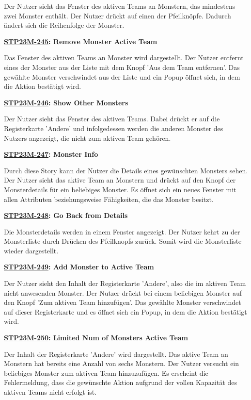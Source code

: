 Der Nutzer sieht das Fenster des aktiven Teams an Monstern, das mindestens zwei Monster enthält. Der Nutzer drückt auf einen der Pfeilknöpfe. Dadurch ändert sich die Reihenfolge der Monster. 

\textbf{\hyperlink{T245}{\hypertarget{S245}{STP23M-245}}: Remove Monster Active Team}

Das Fenster des aktiven Teams an Monster wird dargestellt. Der Nutzer entfernt eines der Monster aus der Liste mit dem Knopf 'Aus dem Team entfernen'. Das gewählte Monster verschwindet aus der Liste und ein Popup öffnet sich, in dem die Aktion bestätigt wird. 

\textbf{\hyperlink{T246}{\hypertarget{S246}{STP23M-246}}: Show Other Monsters}

Der Nutzer sieht das Fenster des aktiven Teams. Dabei drückt er auf die Registerkarte 'Andere' und infolgedessen werden die anderen Monster des Nutzers angezeigt, die nicht zum aktiven Team gehören.

\textbf{\hyperlink{T247}{\hypertarget{S247}{STP23M-247}}: Monster Info}

Durch diese Story kann der Nutzer die Details eines gewünschten Monsters sehen. Der Nutzer sieht das aktive Team an Monstern und drückt auf den Knopf der Monsterdetails für ein beliebiges Monster. Es öffnet sich ein neues Fenster mit allen Attributen beziehungsweise Fähigkeiten, die das Monster besitzt.

\textbf{\hyperlink{T248}{\hypertarget{S248}{STP23M-248}}: Go Back from Details}

Die Monsterdetails werden in einem Fenster angezeigt. Der Nutzer kehrt zu der Monsterliste durch Drücken des Pfeilknopfs zurück. Somit wird die Monsterliste wieder dargestellt.

\textbf{\hyperlink{T249}{\hypertarget{S249}{STP23M-249}}: Add Monster to Active Team}

Der Nutzer sieht den Inhalt der Registerkarte 'Andere', also die im aktiven Team nicht anwesenden Monster. Der Nutzer drückt bei einem beliebigen Monster auf den Knopf 'Zum aktiven Team hinzufügen'. Das gewählte Monster verschwindet auf dieser Registerkarte und es öffnet sich ein Popup, in dem die Aktion bestätigt wird.

\textbf{\hyperlink{T250}{\hypertarget{S250}{STP23M-250}}: Limited Num of Monsters Active Team}

Der Inhalt der Registerkarte 'Andere' wird dargestellt. Das aktive Team an Monstern hat bereits eine Anzahl von sechs Monstern. Der Nutzer versucht ein beliebiges Monster zum aktiven Team hinzuzufügen. Es erscheint die Fehlermeldung, dass die gewünschte Aktion aufgrund der vollen Kapazität des aktiven Teams nicht erfolgt ist.

